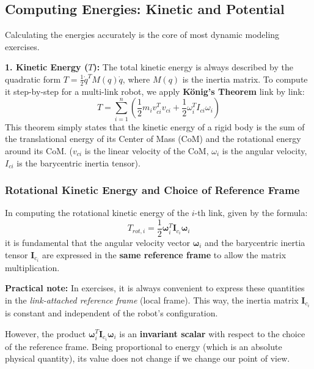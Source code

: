 \documentclass[11pt,a4paper]{article}
\begin{document}
\subsection{Computing Energies: Kinetic and Potential}
Calculating the energies accurately is the core of most dynamic modeling exercises.

\textbf{1. Kinetic Energy ($T$):}
The total kinetic energy is always described by the quadratic form $T = \frac{1}{2} \dot{q}^T M(q) \dot{q}$, where $M(q)$ is the inertia matrix. To compute it step-by-step for a multi-link robot, we apply \textbf{König's Theorem} link by link:
\begin{equation}
    T = \sum_{i=1}^{n} \left( \frac{1}{2}m_i v_{ci}^T v_{ci} + \frac{1}{2}\omega_i^T I_{ci} \omega_i \right)
\end{equation}
This theorem simply states that the kinetic energy of a rigid body is the sum of the translational energy of its Center of Mass (CoM) and the rotational energy around its CoM. ($v_{ci}$ is the linear velocity of the CoM, $\omega_i$ is the angular velocity, $I_{ci}$ is the barycentric inertia tensor).

\subsubsection*{Rotational Kinetic Energy and Choice of Reference Frame}
In computing the rotational kinetic energy of the $i$-th link, given by the formula:
\begin{equation}
    T_{rot,i} = \frac{1}{2} \boldsymbol{\omega}_i^T \boldsymbol{I}_{c_i} \boldsymbol{\omega}_i
\end{equation}
it is fundamental that the angular velocity vector $\boldsymbol{\omega}_i$ and the barycentric inertia tensor $\boldsymbol{I}_{c_i}$ are expressed in the \textbf{same reference frame} to allow the matrix multiplication.

\textbf{Practical note:} In exercises, it is always convenient to express these quantities in the \textit{link-attached reference frame} (local frame). This way, the inertia matrix $\boldsymbol{I}_{c_i}$ is constant and independent of the robot's configuration.

However, the product $\boldsymbol{\omega}_i^T \boldsymbol{I}_{c_i} \boldsymbol{\omega}_i$ is an \textbf{invariant scalar} with respect to the choice of the reference frame. Being proportional to energy (which is an absolute physical quantity), its value does not change if we change our point of view.
\end{document}
